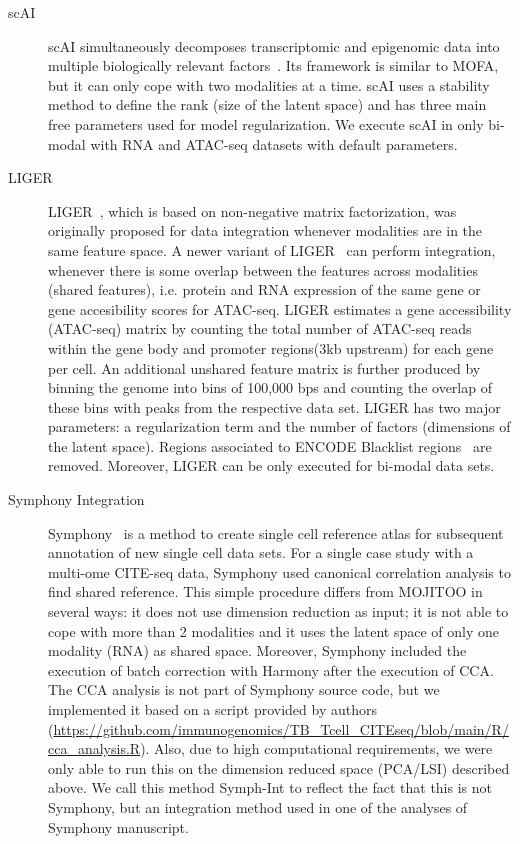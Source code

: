 \begin{description}
\item[scAI]
scAI simultaneously decomposes transcriptomic and epigenomic data into multiple biologically relevant factors~\cite{clark2018scnmt}. Its framework is similar to MOFA, but it can only cope with two modalities at a time. scAI uses a stability method to define the rank (size of the latent space) and has three main free parameters used for model regularization. We execute scAI in only bi-modal with RNA and ATAC-seq datasets with default parameters.


\item[LIGER]
LIGER~\cite{welch2019single}, which is based on non-negative matrix factorization, was originally proposed for data integration whenever modalities are in the same feature space.  A newer variant of LIGER~\cite{kriebel2021nonnegative} can perform integration, whenever there is some overlap between the features across modalities (shared features), i.e. protein and RNA expression of the same gene or gene accesibility scores for ATAC-seq. LIGER estimates a gene accessibility (ATAC-seq) matrix by counting the total number of ATAC-seq reads within the gene body and promoter regions(3kb upstream) for each gene per cell. An additional unshared feature matrix is further produced by binning the genome into bins of 100,000 bps and counting the overlap of these bins with peaks from the respective data set. LIGER has two major parameters: a regularization term and the number of factors (dimensions of the latent space). Regions associated to ENCODE Blacklist regions~\cite{amemiya2019encode} are removed. Moreover, LIGER can be only executed for bi-modal data sets. 

\item[Symphony Integration]
Symphony~\cite{kang2021symphony} is a method to create single cell reference atlas for subsequent annotation of new single cell data sets. For a single case study with a multi-ome CITE-seq data, Symphony used canonical correlation analysis to find shared reference. This simple procedure differs from MOJITOO in several ways: it does not use dimension reduction as input; it is not able to cope with more than 2 modalities and it uses the latent space of only one modality (RNA) as shared space. Moreover, Symphony included the execution of batch correction with Harmony after the execution of CCA. The CCA analysis is not part of Symphony source code, but we implemented it based on a script provided by authors (\url{https://github.com/immunogenomics/TB_Tcell_CITEseq/blob/main/R/cca_analysis.R}). 
Also, due to high computational requirements, we were only able to run this on the dimension reduced space (PCA/LSI) described above. We call this method Symph-Int to reflect the fact that this is not Symphony, but an integration method used in one of the analyses of Symphony manuscript. 


\end{description}

